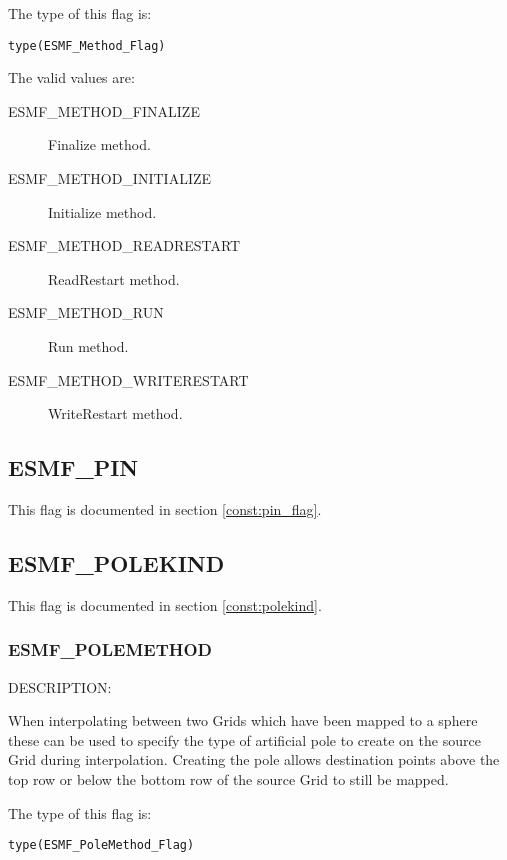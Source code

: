 The type of this flag is:

{\tt type(ESMF\_Method\_Flag)}

The valid values are:
\begin{description}
\item [ESMF\_METHOD\_FINALIZE]
      Finalize method.
\item [ESMF\_METHOD\_INITIALIZE]
      Initialize method.
\item [ESMF\_METHOD\_READRESTART]
      ReadRestart method.
\item [ESMF\_METHOD\_RUN]
      Run method.
\item [ESMF\_METHOD\_WRITERESTART]
      WriteRestart method.
\end{description}

\subsection{ESMF\_PIN}
This flag is documented in section \ref{const:pin_flag}.

\subsection{ESMF\_POLEKIND}
This flag is documented in section \ref{const:polekind}.

\subsubsection{ESMF\_POLEMETHOD}
\label{const:polemethod}

{\sf DESCRIPTION:\\}  
\begin{sloppypar}
When interpolating between two Grids which have been mapped to a sphere these can be used to specify the type of artificial pole to create on the source Grid during interpolation. Creating the pole allows destination points above the top row or below the bottom row of the source Grid to still be mapped.
\end{sloppypar}

The type of this flag is:

{\tt type(ESMF\_PoleMethod\_Flag)}

